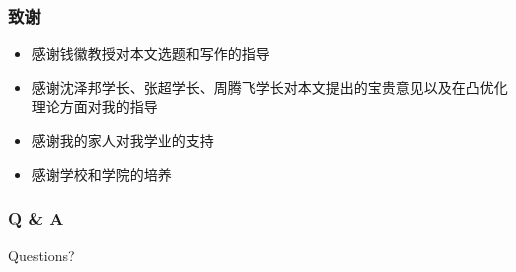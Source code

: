   \frame
  {
    \frametitle{致谢}
    \footnotesize


    \begin{itemize}
        \item 感谢钱徽教授对本文选题和写作的指导
        \item 感谢沈泽邦学长、张超学长、周腾飞学长对本文提出的宝贵意见以及在凸优化理论方面对我的指导
        \item 感谢我的家人对我学业的支持
        \item 感谢学校和学院的培养
    \end{itemize}
  }

  \frame
  {
    \frametitle{Q \& A}
    \begin{block}{Questions?}
      ~\\ ~\\
      \\ ~\\ ~\\ ~\\ ~\\
    \end{block}
  }

